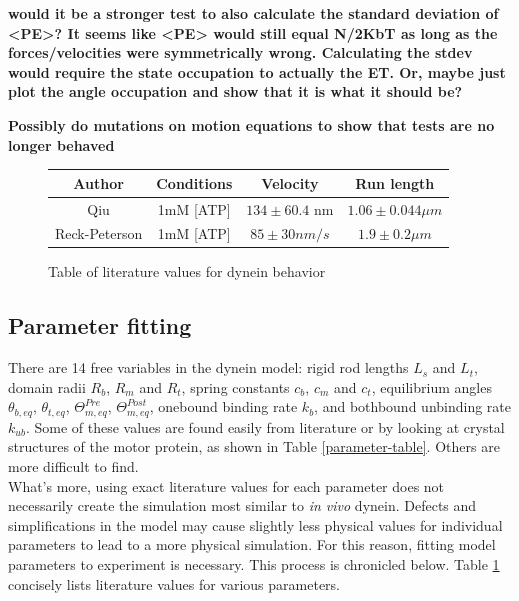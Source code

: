 \documentclass[10pt]{article} %
\begin{document}
\textbf{would it be a stronger test to also calculate the standard deviation of <PE>? It seems like <PE> would still equal N/2KbT as long as the forces/velocities were symmetrically wrong. Calculating the stdev would require the state occupation to actually the ET. Or, maybe just plot the angle occupation and show that it is what it should be?}

\textbf{Possibly do mutations on motion equations to show that tests are no longer behaved}

\begin{figure}[h]
  \centering
  \begin{tabular}{| c | c | c | c |}
    \hline
    Author & Conditions & Velocity & Run length\\\hline
    Qiu \cite{weihongpaper} & 1mM [ATP] & $134 \pm 60.4$ nm & $1.06 \pm 0.044 \mu m$\\ \hline
    Reck-Peterson \cite{reck2006single} & 1mM [ATP] & $85 \pm 30 nm/s$  & $1.9 \pm 0.2 \mu m$\\ \hline
  \end{tabular}
  \caption{Table of literature values for dynein behavior}
  \label{table:parameter-table}
\end{figure}

\subsection{Parameter fitting}
There are 14 free variables in the dynein model: rigid rod lengths $L_s$ and $L_t$, domain radii $R_b$, $R_m$ and $R_t$, spring constants $c_b$, $c_m$ and $c_t$, equilibrium angles $\theta_{b,eq}$, $\theta_{t,eq}$, $\Theta_{m,eq}^{Pre}$, $\Theta_{m,eq}^{Post}$, onebound binding rate $k_b$, and bothbound unbinding rate $k_{ub}$. Some of these values are found easily from literature or by looking at crystal structures of the motor protein, as shown in Table \ref{parameter-table}. Others are more difficult to find.\\

What's more, using exact literature values for each parameter does not necessarily create the simulation most similar to \textit{in vivo} dynein. Defects and simplifications in the model may cause slightly less physical values for individual parameters to lead to a more physical simulation. For this reason, fitting model parameters to experiment is necessary. This process is chronicled below. Table \ref{table:parameter-table} concisely lists literature values for various parameters.
\end{document}
